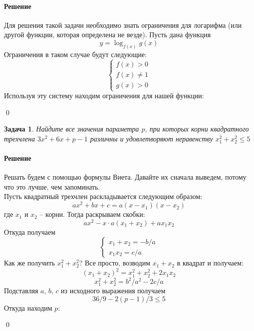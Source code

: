 \documentclass[a4paper,12pt]{report}
\newtheorem{problem}{Задача}[chapter]
\newenvironment{sol}{\paragraph{Решение}}{}
\newcommand{\uni}{\cup}
\begin{document}
	\begin{sol}
		Для решения такой задачи необходимо знать ограничения для логарифма (или другой функции, которая определена не везде). Пусть дана функция
		\[
		y=\log_{f(x)}g(x)
		\]
		Ограничения в таком случае будут следующие:
		\begin{equation*}
			\begin{cases}
				f(x)>0\\
				f(x)\neq1\\
				g(x)>0
			\end{cases}
		\end{equation*}
		Используя эту систему находим ограничения для нашей функции:\\
		\vspace{-5mm}
		\begin{center}
		\fbox{$D_y=(-0.5,0.5)\uni(0.5,1.5)\uni(2,+\infty)$}
		\end{center}
		\qed
	\end{sol}
	
	\begin{problem}
		Найдите все значения параметра \(p\), при которых корни квадратного трехчлена $3x^2+6x+p-1$ различны и удовлетворяют неравенству $x_1^2+x_2^2\leq5$
	\end{problem}
	\begin{sol}
		Решать будем с помощью формулы Виета. Давайте их сначала выведем, потому что это лучше, чем запоминать.\\
		Пусть квадратный трехчлен раскладывается следующим образом: 
		\[
		ax^2+bx+c=a(x-x_1)(x-x_2)
		\]
		где $x_1$ и $x_2$ -- корни. Тогда раскрываем скобки:
		\[
		ax^2-x\cdot a(x_1+x_2)+ax_1x_2
		\]
		Откуда получаем
		\[
		\begin{cases}
			x_1+x_2=-b/a\\
			x_1x_2=c/a
		\end{cases}
		\]
		Как же получить $x_1^2+x_2^2$? Все просто, возводим $x_1+x_2$ в квадрат и получаем:
		\[
		(x_1+x_2)^2=x_1^2+x_2^2+2x_1x_2
		\]
		\[
		x_1^2+x_2^2=b^2/a^2-2c/a
		\]
		Подставляя $a$, $b$, $c$ из исходного выражения получаем
		\[
		36/9-2(p-1)/3\leq5
		\]
		Откуда находим $p$:
		\begin{center}
		\end{center}
		\qed
	\end{sol}
	
\end{document}
